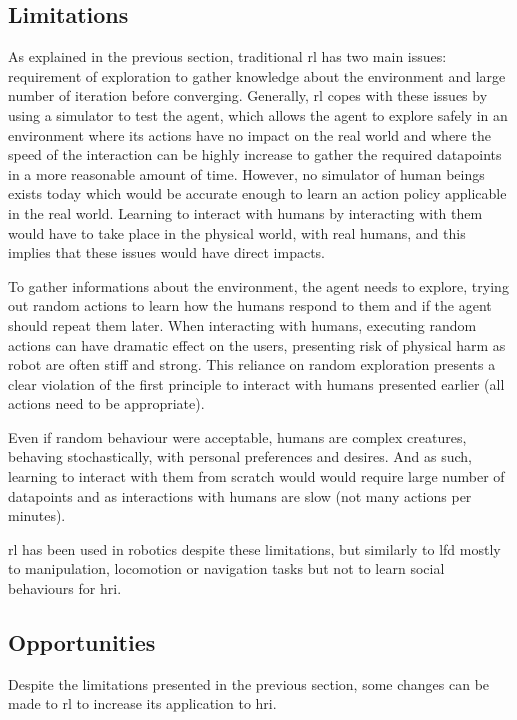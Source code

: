 \subsection{Limitations}

	As explained in the previous section, traditional \gls{rl} has two main issues: requirement of exploration to gather knowledge about the environment and large number of iteration before converging. Generally, \gls{rl} copes with these issues by using a simulator to test the agent, which allows the agent to explore safely in an environment where its actions have no impact on the real world and where the speed of the interaction can be highly increase to gather the required datapoints in a more reasonable amount of time. However, no simulator of human beings exists today which would be accurate enough to learn an action policy applicable in the real world. Learning to interact with humans by interacting with them would have to take place in the physical world, with real humans, and this implies that these issues would have direct impacts. 
	
	To gather informations about the environment, the agent needs to explore, trying out random actions to learn how the humans respond to them and if the agent should repeat them later. When interacting with humans, executing random actions can have dramatic effect on the users, presenting risk of physical harm as robot are often stiff and strong. This reliance on random exploration presents a clear violation of the first principle to interact with humans presented earlier (all actions need to be appropriate).
	
	Even if random behaviour were acceptable, humans are complex creatures, behaving stochastically, with personal preferences and desires. And as such, learning to interact with them from scratch would would require large number of datapoints and as interactions with humans are slow (not many actions per minutes). 
	
	\gls{rl} has been used in robotics despite these limitations\citep{kober2013reinforcement}, but similarly to \gls{lfd} mostly to manipulation, locomotion or navigation tasks but not to learn social behaviours for \gls{hri}. 
	
	
\subsection{Opportunities}  
	Despite the limitations presented in the previous section, some changes can be made to \gls{rl} to increase its application to \gls{hri}.
	  
